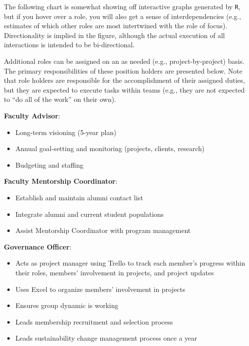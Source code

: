 \documentclass[
]{book}
\providecommand{\tightlist}{%
  \setlength{\itemsep}{0pt}\setlength{\parskip}{0pt}}
\begin{document}
The following chart is somewhat showing off interactive graphs generated by \texttt{R}, but if you hover over a role, you will also get a sense of interdependencies (e.g., estimates of which other roles are most intertwined with the role of focus). Directionality is implied in the figure, although the actual execution of all interactions is intended to be bi-directional.

\hypertarget{htmlwidget-431cb5915dd1b8d4719a}{}

Additional roles can be assigned on an as needed (e.g., project-by-project) basis. The primary responsibilities of these position holders are presented below. Note that role holders are responsible for the accomplishment of their assigned duties, but they are expected to execute tasks within teams (e.g., they are not expected to ``do all of the work'' on their own).

\textbf{Faculty Advisor}:

\begin{itemize}
\tightlist
\item
  Long-term visioning (5-year plan)
\item
  Annual goal-setting and monitoring (projects, clients, research)
\item
  Budgeting and staffing
\end{itemize}

\textbf{Faculty Mentorship Coordinator}:

\begin{itemize}
\tightlist
\item
  Establish and maintain alumni contact list\\
\item
  Integrate alumni and current student populations\\
\item
  Assist Mentorship Coordinator with program management
\end{itemize}

\textbf{Governance Officer}:

\begin{itemize}
\tightlist
\item
  Acts as project manager using Trello to track each member's progress within their roles, members' involvement in projects, and project updates
\item
  Uses Excel to organize members' involvement in projects
\item
  Ensures group dynamic is working
\item
  Leads membership recruitment and selection process\\
\item
  Leads sustainability change management process once a year
\end{itemize}
\end{document}
